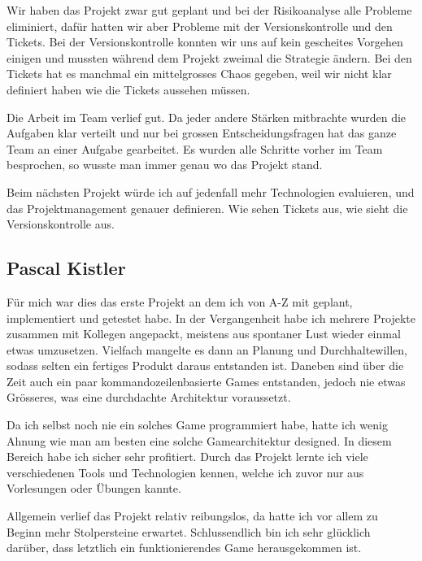 \documentclass[11pt]{scrartcl}
\begin{document}
Wir haben das Projekt zwar gut geplant und bei der Risikoanalyse alle Probleme eliminiert, dafür hatten wir aber Probleme mit der Versionskontrolle und den Tickets. Bei der Versionskontrolle konnten wir uns auf kein gescheites Vorgehen einigen und mussten während dem Projekt zweimal die Strategie ändern. Bei den Tickets hat es manchmal ein mittelgrosses Chaos gegeben, weil wir nicht klar definiert haben wie die Tickets aussehen müssen.

Die Arbeit im Team verlief gut. Da jeder andere Stärken mitbrachte wurden die Aufgaben klar verteilt und nur bei grossen Entscheidungsfragen hat das ganze Team an einer Aufgabe gearbeitet. Es wurden alle Schritte vorher im Team besprochen, so wusste man immer genau wo das Projekt stand.

Beim nächsten Projekt würde ich auf jedenfall mehr Technologien evaluieren, und das Projektmanagement genauer definieren. Wie sehen Tickets aus, wie sieht die Versionskontrolle aus.
\newpage
\subsection{Pascal Kistler}
Für mich war dies das erste Projekt an dem ich von A-Z mit geplant, implementiert und getestet habe. In der Vergangenheit habe ich mehrere Projekte zusammen mit Kollegen angepackt, meistens aus spontaner Lust wieder einmal etwas umzusetzen. Vielfach mangelte es dann an Planung und Durchhaltewillen, sodass selten ein fertiges Produkt daraus entstanden ist. Daneben sind über die Zeit auch ein paar kommandozeilenbasierte Games entstanden, jedoch nie etwas Grösseres, was eine durchdachte Architektur voraussetzt.

Da ich selbst noch nie ein solches Game programmiert habe, hatte ich wenig Ahnung wie man am besten eine solche Gamearchitektur designed. In diesem Bereich habe ich sicher sehr profitiert. Durch das Projekt lernte ich viele  verschiedenen Tools und Technologien kennen, welche ich zuvor nur aus Vorlesungen oder Übungen kannte.

Allgemein verlief das Projekt relativ reibungslos, da hatte ich vor allem zu Beginn mehr Stolpersteine erwartet. 
Schlussendlich bin ich sehr glücklich darüber, dass letztlich ein funktionierendes Game herausgekommen ist.
\end{document}
